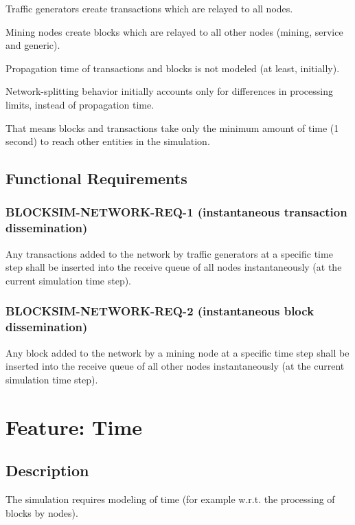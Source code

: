 \documentclass{scrreprt}
\begin{document}
      Traffic generators create transactions which are relayed to all nodes.

      Mining nodes create blocks which are relayed to all other nodes (mining,
      service and generic).

      Propagation time of transactions and blocks is not modeled (at least,
      initially).

      Network-splitting behavior initially accounts only for differences in
      processing limits, instead of propagation time.

      That means blocks and transactions take only the minimum amount of time
      (1 second) to reach other entities in the simulation.

    \subsection{Functional Requirements}

      \subsubsection{BLOCKSIM-NETWORK-REQ-1 (instantaneous transaction dissemination)}

        Any transactions added to the network by traffic generators at a
        specific time step shall be inserted into the receive queue of all
        nodes instantaneously (at the current simulation time step).

      \subsubsection{BLOCKSIM-NETWORK-REQ-2 (instantaneous block dissemination)}

        Any block added to the network by a mining node at a specific time step
        shall be inserted into the receive queue of all other nodes
        instantaneously (at the current simulation time step).

  \section{Feature: Time}

    \subsection{Description}

      The simulation requires modeling of time (for example w.r.t.  the
      processing of blocks by nodes).
\end{document}
